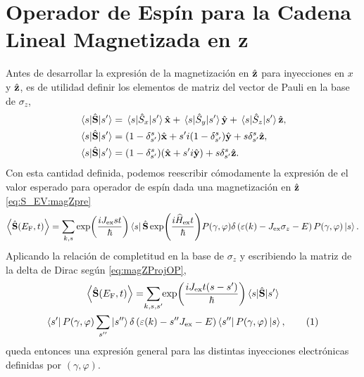 \chapter{Operador de Espín para la Cadena Lineal Magnetizada en z}
\label{ap:S_EV:magZ}

Antes de desarrollar la expresión de la magnetización en $ \hat{\vb z} $ para inyecciones en $ x $ y $ \hat{\vb z} $, es de utilidad definir los elementos de matriz del vector de Pauli en la base de $ \sigma_z $,
\begin{align*}
	\matrixel{s}{ \hat{\vector{S}} }{s'} &= \matrixel{s}{\hat{S}_x}{s'} \hat{\vector x} + \matrixel{s}{\hat{S}_y}{s'} \hat{\vector y} + \matrixel{s}{\hat{S}_z}{s'} \hat{\vector z}, \\
	\matrixel{s}{ \hat{\vector{S}} }{s'} &= (1 - \delta^s_{s'}) \hat{\vector x} + s'i(1- \delta^s_{s'}) \hat{\vector y} + s\delta^s_{s'} \hat{\vector z}, \\ 
	\matrixel{s}{ \hat{\vector{S}} }{s'} &= (1 - \delta^s_{s'}) ( \hat{\vector x} + s'i \hat{\vector y}) + s\delta^s_{s'}\hat{\vector z}.
\end{align*}
Con esta cantidad definida, podemos reescribir cómodamente la expresión de el valor esperado para operador de espín dada una magnetización en $ \hat{\vb z} $ \eqref{eq:S_EV:magZpre}
\begin{equation*}
	\expval{\hat{\vb S}(E_{\rm{F}},t)} = \sum_{k, s} \exp(\frac{i J_{\rm ex }s t}{\hbar}) \bra{ s}\hat{\vb S} \exp(\frac{i\widehat{H}_{\rm ex}t}{\hbar})P(\gamma,\varphi) \delta\left (\varepsilon(k) -J_{\rm ex} \sigma_z  -E\right)P(\gamma,\varphi)\ket{s}.
\end{equation*}
Aplicando la relación de completitud en la base de $ \sigma_z $ y escribiendo la matriz de la delta de Dirac según \eqref{eq:magZProjOP},
\begin{multline}
	\expval{\hat{\vector S}(E_{\rm{F}},t)} = \smashoperator{\sum_{k, s, s'}} \exp(\frac{i J_{\rm ex } t (s - s')}{\hbar}) \matrixel{s}{ \hat{\vector{S}} }{s'} \\
	\bra{s'} P(\gamma, \varphi) \sum_{s''} \ket{s''} \delta\left(\varepsilon(k) - s''J_{\rm ex} -E \right) \bra{s''} P(\gamma, \varphi) \ket{s},\numberthis
\end{multline}
queda entonces una expresión general para las distintas inyecciones electrónicas definidas por $ (\gamma, \varphi) $.

